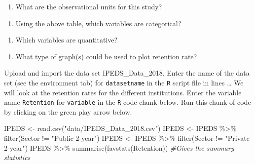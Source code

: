 \documentclass[
]{report}
\newenvironment{Shaded}{\begin{snugshade}}{\end{snugshade}}
\newcommand{\CommentTok}[1]{\textcolor[rgb]{0.56,0.35,0.01}{\textit{#1}}}
\newcommand{\FunctionTok}[1]{\textcolor[rgb]{0.00,0.00,0.00}{#1}}
\newcommand{\NormalTok}[1]{#1}
\newcommand{\OtherTok}[1]{\textcolor[rgb]{0.56,0.35,0.01}{#1}}
\newcommand{\SpecialCharTok}[1]{\textcolor[rgb]{0.00,0.00,0.00}{#1}}
\newcommand{\StringTok}[1]{\textcolor[rgb]{0.31,0.60,0.02}{#1}}
\providecommand{\tightlist}{%
  \setlength{\itemsep}{0pt}\setlength{\parskip}{0pt}}
\begin{document}
\begin{enumerate}
\def\labelenumi{\arabic{enumi}.}
\tightlist
\item
  What are the observational units for this study?
\end{enumerate}

\vspace{0.3in}

\begin{enumerate}
\def\labelenumi{\arabic{enumi}.}
\setcounter{enumi}{1}
\tightlist
\item
  Using the above table, which variables are categorical?
\end{enumerate}

\vspace{1in}

\begin{enumerate}
\def\labelenumi{\arabic{enumi}.}
\setcounter{enumi}{2}
\tightlist
\item
  Which variables are quantitative?
\end{enumerate}

\vspace{1in}

\begin{enumerate}
\def\labelenumi{\arabic{enumi}.}
\setcounter{enumi}{3}
\tightlist
\item
  What type of graph(s) could be used to plot retention rate?
\end{enumerate}

\vspace{0.5in}

Upload and import the data set IPEDS\_Data\_2018. Enter the name of the data set (see the environment tab) for \texttt{datasetname} in the \texttt{R} script file in lines \ldots{} We will look at the retention rates for the different institutions. Enter the variable name \texttt{Retention} for \texttt{variable} in the \texttt{R} code chunk below. Run this chunk of code by clicking on the green play arrow below.

\begin{Shaded}
\begin{Highlighting}[]
\NormalTok{IPEDS }\OtherTok{\textless{}{-}} \FunctionTok{read.csv}\NormalTok{(}\StringTok{"data/IPEDS\_Data\_2018.csv"}\NormalTok{)}
\NormalTok{IPEDS }\OtherTok{\textless{}{-}}\NormalTok{ IPEDS }\SpecialCharTok{\%\textgreater{}\%}
  \FunctionTok{filter}\NormalTok{(Sector }\SpecialCharTok{!=} \StringTok{"Public 2{-}year"}\NormalTok{) }
\NormalTok{IPEDS }\OtherTok{\textless{}{-}}\NormalTok{ IPEDS }\SpecialCharTok{\%\textgreater{}\%}
  \FunctionTok{filter}\NormalTok{(Sector }\SpecialCharTok{!=} \StringTok{"Private 2{-}year"}\NormalTok{)   }
\NormalTok{IPEDS }\SpecialCharTok{\%\textgreater{}\%}
  \FunctionTok{summarise}\NormalTok{(}\FunctionTok{favstats}\NormalTok{(Retention)) }\CommentTok{\#Gives the summary statistics}
\end{Highlighting}
\end{Shaded}
\end{document}

